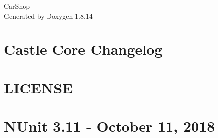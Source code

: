 \documentclass[twoside]{book}
\newcommand{\+}{\discretionary{\mbox{\scriptsize$\hookleftarrow$}}{}{}}
\newcommand{\clearemptydoublepage}{%
  \newpage{\pagestyle{empty}\cleardoublepage}%
}
\begin{document}
\hypersetup{pageanchor=false,
             bookmarksnumbered=true,
             pdfencoding=unicode
            }
\begin{titlepage}
\vspace*{7cm}
\begin{center}%
{\Large Car\+Shop }\\
\vspace*{1cm}
{\large Generated by Doxygen 1.8.14}\\
\end{center}
\end{titlepage}
\clearemptydoublepage
{}
\tableofcontents
\clearemptydoublepage
{}
\hypersetup{pageanchor=true}

\chapter{Castle Core Changelog}
\label{md__e_1__users__dre_ta_x__documents__visual__studio_2013__prog3__beadando__c_s_h_a_r_p__o_e_n_i_96e7c9b69afd21696cf9649aeb5e60e1}

\chapter{L\+I\+C\+E\+N\+SE}
\label{md__e_1__users__dre_ta_x__documents__visual__studio_2013__prog3__beadando__c_s_h_a_r_p__o_e_n_i_d4df63a97adf94f04d7c475dbce556df}

\chapter{N\+Unit 3.11 -\/ October 11, 2018}
\label{md__e_1__users__dre_ta_x__documents__visual__studio_2013__prog3__beadando__c_s_h_a_r_p__o_e_n_i_9115b5943ca24eb69a1b16c3fec2e0ee}

\end{document}
